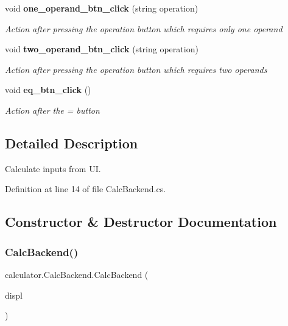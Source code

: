 \begin{DoxyCompactItemize}
void \textbf{ one\+\_\+operand\+\_\+btn\+\_\+click} (string operation)
\begin{DoxyCompactList}\small\item\em Action after pressing the operation button which requires only one operand \end{DoxyCompactList}\item 
void \textbf{ two\+\_\+operand\+\_\+btn\+\_\+click} (string operation)
\begin{DoxyCompactList}\small\item\em Action after pressing the operation button which requires two operands \end{DoxyCompactList}\item 
void \textbf{ eq\+\_\+btn\+\_\+click} ()
\begin{DoxyCompactList}\small\item\em Action after the \textquotesingle{}=\textquotesingle{} button \end{DoxyCompactList}\end{DoxyCompactItemize}


\subsection{Detailed Description}
Calculate inputs from UI. 



Definition at line 14 of file Calc\+Backend.\+cs.



\subsection{Constructor \& Destructor Documentation}
\mbox{\label{classcalculator_1_1_calc_backend_a6a8887876c5ed8923c1f05f51a23cedf}} 
\subsubsection{Calc\+Backend()}
{\footnotesize\ttfamily calculator.\+Calc\+Backend.\+Calc\+Backend (\begin{DoxyParamCaption}\item[{Text\+Block}]{displ }\end{DoxyParamCaption})}



